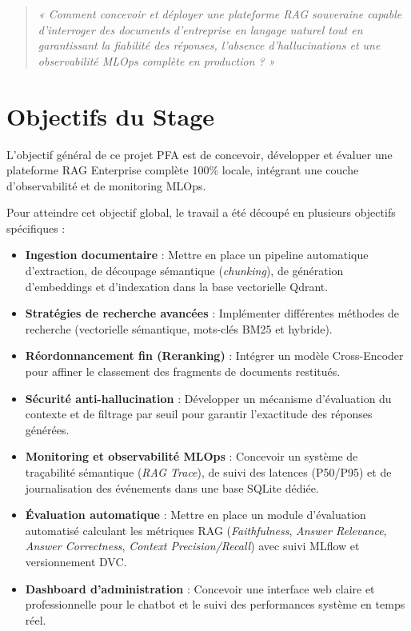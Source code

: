 \begin{quote}
\textit{« Comment concevoir et déployer une plateforme RAG souveraine capable d'interroger des documents d'entreprise en langage naturel tout en garantissant la fiabilité des réponses, l'absence d'hallucinations et une observabilité MLOps complète en production ? »}
\end{quote}

\section*{Objectifs du Stage}
L'objectif général de ce projet PFA est de concevoir, développer et évaluer une plateforme RAG Enterprise complète 100\% locale, intégrant une couche d'observabilité et de monitoring MLOps.

Pour atteindre cet objectif global, le travail a été découpé en plusieurs objectifs spécifiques :
\begin{itemize}
    \item \textbf{Ingestion documentaire} : Mettre en place un pipeline automatique d'extraction, de découpage sémantique (\textit{chunking}), de génération d'embeddings et d'indexation dans la base vectorielle Qdrant.
    \item \textbf{Stratégies de recherche avancées} : Implémenter différentes méthodes de recherche (vectorielle sémantique, mots-clés BM25 et hybride).
    \item \textbf{Réordonnancement fin (Reranking)} : Intégrer un modèle Cross-Encoder pour affiner le classement des fragments de documents restitués.
    \item \textbf{Sécurité anti-hallucination} : Développer un mécanisme d'évaluation du contexte et de filtrage par seuil pour garantir l'exactitude des réponses générées.
    \item \textbf{Monitoring et observabilité MLOps} : Concevoir un système de traçabilité sémantique (\textit{RAG Trace}), de suivi des latences (P50/P95) et de journalisation des événements dans une base SQLite dédiée.
    \item \textbf{Évaluation automatique} : Mettre en place un module d'évaluation automatisé calculant les métriques RAG (\textit{Faithfulness}, \textit{Answer Relevance}, \textit{Answer Correctness}, \textit{Context Precision/Recall}) avec suivi MLflow et versionnement DVC.
    \item \textbf{Dashboard d'administration} : Concevoir une interface web claire et professionnelle pour le chatbot et le suivi des performances système en temps réel.
\end{itemize}

